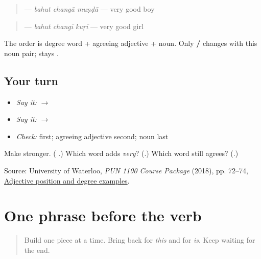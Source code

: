 \begin{quote}
\textbf{  } — \emph{bahut changā muṇḍā} — very good boy
\end{quote}

\begin{quote}
\textbf{  } — \emph{bahut changī kuṛī} — very good girl
\end{quote}

The order is degree word + agreeing adjective + noun. Only \textbf{ / } changes with this noun pair; \textbf{} stays \textbf{}.

\subsection*{Your turn}
\begin{itemize}
\raggedright
  \item \emph{Say it:} \textbf{  $\to$   }
  \item \emph{Say it:} \textbf{  $\to$   }
  \item \emph{Check:} \textbf{} first; agreeing adjective second; noun last
\end{itemize}

\begin{tcolorbox}[breakable,colback=teal!4,colframe=teal!35!black,title={Before you move on}]
Make \textbf{ } stronger. (\textbf{  }.) Which word adds \emph{very}? (\textbf{}.) Which word still agrees? (\textbf{}.)

Source: University of Waterloo, \emph{PUN 1100 Course Package} (2018), pp. 72–74, \href{https://openlibrary-repo.ecampusontario.ca/jspui/bitstream/123456789/492/2/2018Pun1100CoursePackage.pdf}{Adjective position and degree examples}.
\end{tcolorbox}
\section[\texorpdfstring{\pa{ਇਹ} \pa{ਬਹੁਤ} \pa{ਚੰਗੀ} \pa{ਕੁੜੀ} \pa{ਹੈ} (eh bahut changi …)}{ਇਹ ਬਹੁਤ ਚੰਗੀ ਕੁੜੀ ਹੈ (eh bahut changi …)}]{One phrase before the verb}

\label{lesson:PA-C177-noun-phrase}



\begin{quote}
Build \textbf{  } one piece at a time. Bring back \textbf{} for \emph{this} and \textbf{} for \emph{is}. Keep \textbf{} waiting for the end.
\end{quote}


